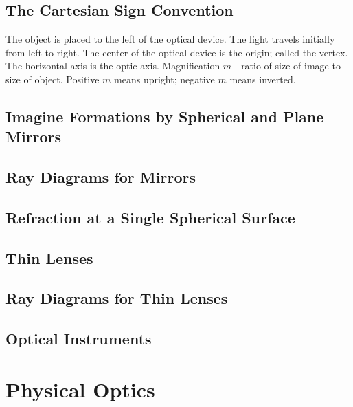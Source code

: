 \documentclass[twocolumn]{article}
\begin{document}
\subsection{The Cartesian Sign Convention}
\begin{outline}
\1 The object is placed to the left of the optical device. The light travels initially from left to right. 
\1 The center of the optical device is the origin; called the vertex. The horizontal axis is the optic axis. 
\1 Magnification $m$ - ratio of size of image to size of object. Positive $m$ means upright; negative $m$ means inverted. 

\end{outline}
\subsection{Imagine Formations by Spherical and Plane Mirrors}
\begin{outline}
\1 
\end{outline}
\subsection{Ray Diagrams for Mirrors}
\begin{outline}
\1 
\end{outline}
\subsection{Refraction at a Single Spherical Surface}
\begin{outline}
\1 
\end{outline}
\subsection{Thin Lenses}
\begin{outline}
\1 
\end{outline}
\subsection{Ray Diagrams for Thin Lenses}
\begin{outline}
\1 
\end{outline}
\subsection{Optical Instruments}
\begin{outline}
\1 
\end{outline}
\section{Physical Optics}
\end{document}
